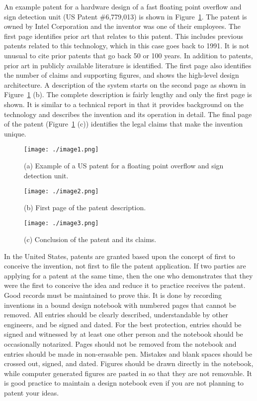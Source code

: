 An example patent for a hardware design of a fast floating point
overflow and sign detection unit (US Patent \#6,779,013) is shown in
Figure~\ref{figure:patentFloatingPoint}.
The patent is owned by Intel Corporation and the inventor
was one of their employees. The first page identifies prior art that
relates to this patent. This includes previous patents related to this
technology, which in this case goes back to 1991. It is not unusual to
cite prior patents that go back 50 or 100 years. In addition to patents,
prior art in publicly available literature is identified. The first page
also identifies the number of claims and supporting figures, and shows
the high-level design architecture. A description of the system starts
on the second page as shown in 
Figure~\ref{figure:patentFloatingPoint} (b). The complete description
is fairly lengthy and only the first page is shown. It is similar to a
technical report in that it provides background on the technology and
describes the invention and its operation in detail. The final page of
the patent (Figure~\ref{figure:patentFloatingPoint} (c)) 
identifies the legal claims that make the invention unique.

\begin{figure}
\texttt{[image: ./image1.png]}
\caption{(a) Example of a US patent for a floating point
overflow and sign detection unit.}
\label{figure:patentFloatingPoint}
\end{figure}

\begin{figure}
\ContinuedFloat
\texttt{[image: ./image2.png]}
\caption{(b) First page of the patent description.}
\end{figure}

\begin{figure}
\ContinuedFloat
\texttt{[image: ./image3.png]}
\caption{(c) Conclusion of the patent and its claims.}
\end{figure}


In the United States, patents are granted based upon the concept of
first to conceive the invention, not first to file the patent
application. If two parties are applying for a patent at the same time,
then the one who demonstrates that they were the first to conceive the
idea and reduce it to practice receives the patent. Good records must be
maintained to prove this. It is done by recording inventions in a bound
design notebook with numbered pages that cannot be removed. All entries
should be clearly described, understandable by other engineers, and be
signed and dated. For the best protection, entries should be signed and
witnessed by at least one other person and the notebook should be
occasionally notarized. Pages should not be removed from the notebook
and entries should be made in non-erasable pen. Mistakes and blank
spaces should be crossed out, signed, and dated. Figures should be drawn
directly in the notebook, while computer generated figures are pasted in
so that they are not removable. It is good practice to maintain a design
notebook even if you are not planning to patent your ideas.

